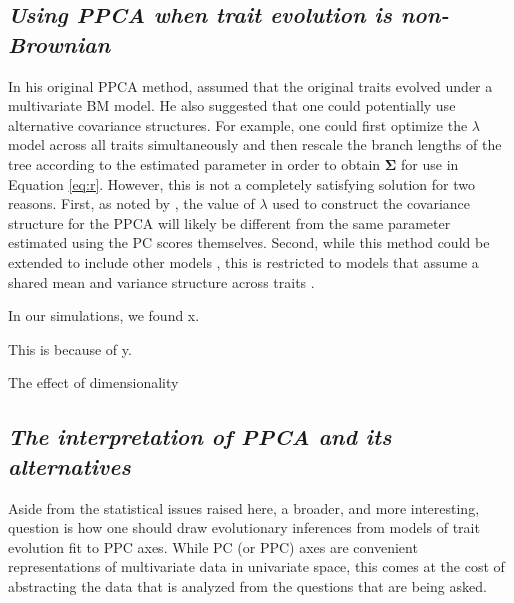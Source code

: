 \documentclass[a4paper,12pt]{article}
\begin{document}
\subsection{\emph{Using PPCA when trait evolution is non-Brownian}}
In his original PPCA method, \citet{Revell2008} assumed that the original traits evolved under a multivariate BM model. He also suggested that one could potentially use alternative covariance structures. For example, one could first optimize the $\lambda$ model \citep{Pagel1999} across all traits simultaneously \citep[using the method of][]{Freckleton2002} and then rescale the branch lengths of the tree according to the estimated parameter in order to obtain $\mathbf{\Sigma}$ for use in Equation \ref{eq:r}. However, this is not a completely satisfying solution for two reasons. First, as noted by \citet{Revell2008}, the value of $\lambda$ used to construct the covariance structure for the PPCA will likely be different from the same parameter estimated using the PC scores themselves. Second, while this method could be extended to include other models \citep{ButlerKing2009, motmot}, this is restricted to models that assume a shared mean and variance structure across traits \citep[see][for examples where this does not  apply]{Hansen2008, Bartoszek2012}.

In our simulations, we found x.

This is because of y.

The effect of dimensionality

\subsection{\emph{The interpretation of PPCA and its alternatives}}

Aside from the statistical issues raised here, a broader, and more interesting, question is how one should draw evolutionary inferences from models of trait evolution fit to PPC axes. While PC (or PPC) axes are convenient representations of multivariate data in univariate space, this comes at the cost of abstracting the data that is analyzed from the questions that are being asked. 
\end{document}
